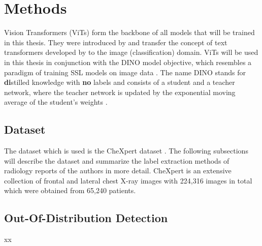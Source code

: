 \section{Methods}
Vision Transformers (ViTs) form the backbone of all models that will be trained in this thesis.
They were introduced by \citep{Dosovitskiy2020} and transfer the concept of text transformers developed by \citep{Vaswani2017} to the image (classification) domain.
ViTs will be used in this thesis in conjunction with the DINO model objective, which resembles a paradigm of training SSL models on image data \citep{Caron2021}.
The name DINO stands for \textbf{di}stilled knowledge with \textbf{no} labels and consists of a student and a teacher network, where the teacher network is updated by the exponential moving average of the student's weights \citep{Caron2021}.

\subsection{Dataset}
The dataset which is used is the CheXpert dataset \citep{Irvin2019}.
The following subsections will describe the dataset and summarize the label extraction methods of radiology reports of the authors in more detail.
CheXpert is an extensive collection of frontal and lateral chest X-ray images with 224,316 images in total which were obtained from 65,240 patients.
\subsection{Out-Of-Distribution Detection}
xx


